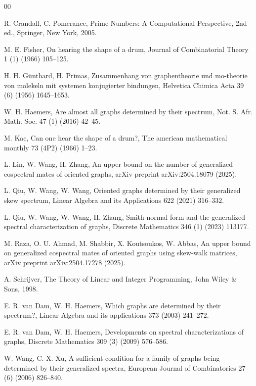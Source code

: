 \documentclass[12pt]{article}
\theoremstyle{plain}
\theoremstyle{definition}
\begin{document}
\begin{thebibliography}{00}

 R. Crandall, C. Pomerance, Prime Numbers: A Computational Perspective, 2nd ed., Springer, New York, 2005.

 M. E. Fisher, On hearing the shape of a drum, Journal of Combinatorial Theory 1 (1) (1966) 105–125.

 H. H. G{\"u}nthard, H. Primas, Zusammenhang von graphentheorie und mo-theorie von molekeln mit systemen konjugierter bindungen, Helvetica Chimica Acta 39 (6) (1956) 1645–1653.

 W. H. Haemers, Are almost all graphs determined by their spectrum, Not. S. Afr. Math. Soc. 47 (1) (2016) 42–45. 

 M. Kac, Can one hear the shape of a drum?, The american mathematical monthly 73 (4P2) (1966) 1–23.

 L. Lin, W. Wang, H. Zhang, An upper bound on the number of generalized cospectral mates of oriented graphs, arXiv preprint arXiv:2504.18079 (2025).

 L. Qiu, W. Wang, W. Wang, Oriented graphs determined by their generalized skew spectrum, Linear Algebra and its Applications 622 (2021) 316–332.

 L. Qiu, W. Wang, W. Wang, H. Zhang, Smith normal form and the generalized spectral characterization of graphs, Discrete Mathematics 346 (1) (2023) 113177.

 M. Raza, O. U. Ahmad, M. Shabbir, X. Koutsoukos, W. Abbas, An upper bound on generalized cospectral mates of oriented graphs using skew-walk matrices, arXiv preprint arXiv:2504.17278 (2025).

 A. Schrijver, The Theory of Linear and Integer Programming, John Wiley \& Sons, 1998.

 E. R. van Dam, W. H. Haemers, Which graphs are determined by their spectrum?, Linear Algebra and its applications 373 (2003) 241–272.

 E. R. van Dam, W. H. Haemers, Developments on spectral characterizations of graphs, Discrete Mathematics 309 (3) (2009) 576–586.

 W. Wang, C. X. Xu, A sufficient condition for a family of graphs being determined by their generalized spectra, European Journal of Combinatorics 27 (6) (2006) 826–840.


\end{thebibliography}
\end{document}
